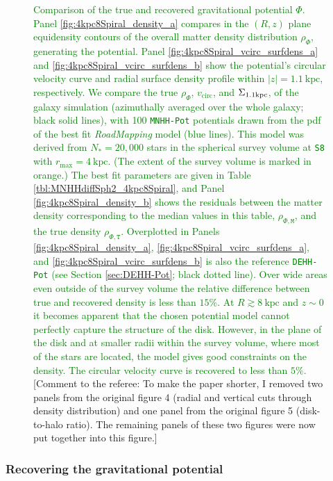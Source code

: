 \documentclass[iop,revtex4,numberedappendix,appendixfloats]{emulateapj}
\newcommand{\RM}{{\sl RoadMapping}}
\newcommand{\NEW}[1]{\textcolor{Green}{#1}}
\newcommand{\COMMENT}[1]{\textcolor{ProcessBlue}{#1}}
\begin{document}
\begin{figure}[!htbp]
\begin{minipage}{\textwidth}
    \end{minipage}
    \caption{\NEW{Comparison of the true and recovered gravitational potential $\Phi$. Panel \ref{fig:4kpc8Spiral_density_a} compares in the $(R,z)$ plane equidensity contours of the overall matter density distribution $\rho_{\Phi}$, generating the potential. Panel \ref{fig:4kpc8Spiral_vcirc_surfdens_a} and \ref{fig:4kpc8Spiral_vcirc_surfdens_b} show the potential's circular velocity curve and radial surface density profile within $|z|=1.1~\text{kpc}$, respectively. We compare the true $\rho_{\Phi}$, $v_\text{circ}$, and $\Sigma_{\rm 1.1kpc}$, of the galaxy simulation (azimuthally averaged over the whole galaxy; black solid lines), with 100 \texttt{MNHH-Pot} potentials drawn from the pdf of the best fit \RM{} model (blue lines). This model was derived from $N_*=20,000$ stars in the spherical survey volume at \texttt{S8} with $r_\text{max}=4~\text{kpc}$. (The extent of the survey volume is marked in orange.) The best fit parameters are given in Table \ref{tbl:MNHHdiffSph2_4kpc8Spiral}, and Panel \ref{fig:4kpc8Spiral_density_b} shows the residuals between the matter density corresponding to the median values in this table, $\rho_{\Phi,\texttt{M}}$, and the true density  $\rho_{\Phi,\texttt{T}}$. Overplotted in Panels \ref{fig:4kpc8Spiral_density_a}, \ref{fig:4kpc8Spiral_vcirc_surfdens_a}, and \ref{fig:4kpc8Spiral_vcirc_surfdens_b} is also the reference \texttt{DEHH-Pot} (see Section \ref{sec:DEHH-Pot}; black dotted line). Over wide areas even outside of the survey volume the relative difference between true and recovered density is less than $15\%$. At $R\gtrsim8~\text{kpc}$ and $z\sim0$ it becomes apparent that the chosen potential model cannot perfectly capture the structure of the disk. However, in the plane of the disk and at smaller radii within the survey volume, where most of the stars are located, the model gives good constraints on the density. The circular velocity curve is recovered to less than $5\%$.} \COMMENT{[Comment to the referee: To make the paper shorter, I removed two panels from the original figure 4 (radial and vertical cuts through density distribution) and one panel from the original figure 5 (disk-to-halo ratio). The remaining panels of these two figures were now put together into this figure.]}}
\label{fig:4kpc8Spiral_dens_vcirc_surfdens}
\end{figure}

\subsubsection{Recovering the gravitational potential} \label{sec:4kpc8Spiral_potential}
\end{document}
